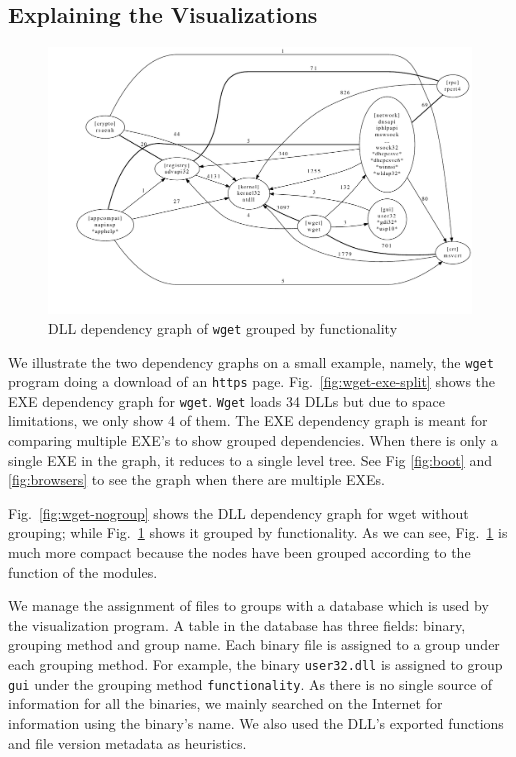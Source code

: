 \subsection{Explaining the Visualizations}

\begin{figure}[thb]
\centering
\includegraphics[width=1.0\columnwidth]{dep-wget-function.pdf}
\caption{DLL dependency graph of {\tt wget} grouped by functionality}
\label{fig:wget-function}
\end{figure}

We illustrate the two dependency graphs on a small example, namely, the
{\tt wget} program doing a download of an {\tt https} page.
Fig.~\ref{fig:wget-exe-split} shows the EXE dependency graph for {\tt wget}.
{\tt Wget} loads 34 DLLs but due to space limitations, we only show 4 of
them.
The EXE dependency graph is meant for comparing multiple EXE's to show
grouped dependencies. 
When there is only a single EXE in the graph, it reduces to a single level
tree. See Fig \ref{fig:boot} and \ref{fig:browsers} to see the graph
when there are multiple EXEs.

Fig.~\ref{fig:wget-nogroup} shows the DLL
dependency graph for wget without grouping; while
Fig.~\ref{fig:wget-function} shows it grouped by functionality.
As we can see, Fig.~\ref{fig:wget-function} is much more compact
because the nodes have been grouped according to the function of the modules.

We manage the assignment of files to groups with a data\-base which is
used by the visualization program.
A table in the database has three fields: binary,
grouping method and group name.
Each binary file is assigned to a group under each grouping method.
For example, the binary {\tt user32.dll} is assigned to group {\tt gui} under
the grouping method {\tt functi\-onality}.
As there is no single source of information for all the binaries, we mainly
searched on the Internet for information using the binary's name.
We also used the DLL's exported functions and file version metadata 
as heuristics.


